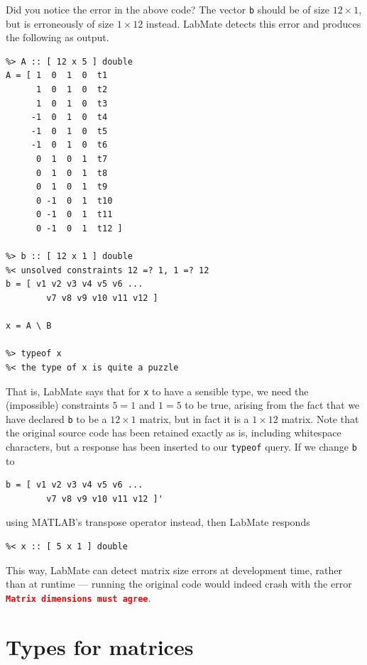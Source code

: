 \documentclass{IMEKO2024}
\begin{document}
Did you notice the error in the above code? The vector \texttt{b} should be of size $12 \times 1$, but is erroneously of size $1 \times 12$ instead. LabMate detects this error and produces the following as output.
\begin{verbatim}
%> A :: [ 12 x 5 ] double
A = [ 1  0  1  0  t1
      1  0  1  0  t2
      1  0  1  0  t3
     -1  0  1  0  t4
     -1  0  1  0  t5
     -1  0  1  0  t6
      0  1  0  1  t7
      0  1  0  1  t8
      0  1  0  1  t9
      0 -1  0  1  t10
      0 -1  0  1  t11
      0 -1  0  1  t12 ]

%> b :: [ 12 x 1 ] double
%< unsolved constraints 12 =? 1, 1 =? 12
b = [ v1 v2 v3 v4 v5 v6 ...
        v7 v8 v9 v10 v11 v12 ]

x = A \ B

%> typeof x
%< the type of x is quite a puzzle
\end{verbatim}
%
That is, LabMate says that for \texttt{x} to have a sensible type, we need the (impossible) constraints $5 = 1$ and $1 = 5$ to be true, arising from the fact that we have declared \texttt{b} to be a $12 \times 1$ matrix, but in fact it is a $1 \times 12$ matrix. Note that the original source code has been retained exactly as is, including whitespace characters, but a response has been inserted to our \texttt{typeof} query. If we change \texttt{b} to
\begin{verbatim}
b = [ v1 v2 v3 v4 v5 v6 ...
        v7 v8 v9 v10 v11 v12 ]'
\end{verbatim}
using MATLAB's transpose operator instead, then LabMate responds
\begin{verbatim}
%< x :: [ 5 x 1 ] double
\end{verbatim}
This way, LabMate can detect matrix size errors at development time, rather than at runtime --- running the original code would indeed crash with the error \textcolor{red}{\textbf{\texttt{Matrix dimensions must agree}}}.

\section{Types for matrices}
\end{document}
